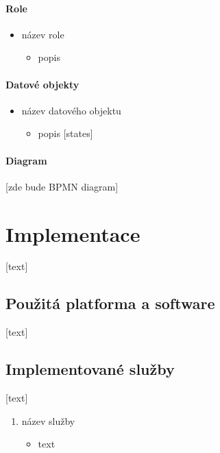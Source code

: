 \documentclass[11pt,a4paper]{article}
\begin{document}
\paragraph{Role}

\begin{itemize}
    \item název role
    \begin{itemize}
        \item popis
    \end{itemize}
\end{itemize}

\paragraph{Datové objekty}

\begin{itemize}
    \item název datového objektu
    \begin{itemize}
        \item popis [states]
    \end{itemize}
\end{itemize}

\paragraph{Diagram}

[zde bude BPMN diagram]

\section{Implementace}

[text]

\subsection{Použitá platforma a software}

[text]

\subsection{Implementované služby}

[text]

\begin{enumerate}
    \item název služby
    \begin{itemize}
        \item text
    \end{itemize}
\end{enumerate}
\end{document}
